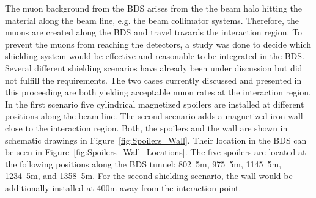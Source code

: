 \documentclass[12pt]{article}
\begin{document}
The muon background from the BDS arises from the the beam halo hitting the material along the beam line, e.g. the beam collimator systems.
Therefore, the muons are created along the BDS and travel towards the interaction region.
To prevent the muons from reaching the detectors, a study was done to decide which shielding system would be effective and reasonable to be integrated in the BDS.
Several different shielding scenarios have already been under discussion but did not fulfill the requirements.
The two cases currently discussed and presented in this proceeding are both yielding acceptable muon rates at the interaction region.
In the first scenario five cylindrical magnetized spoilers are installed at different positions along the beam line.
The second scenario adds a magnetized iron wall close to the interaction region.
Both, the spoilers and the wall are shown in schematic drawings in Figure~\ref{fig:Spoilers_Wall}.
Their location in the BDS can be seen in Figure~\ref{fig:Spoilers_Wall_Locations}.
The five spoilers are located at the following positions along the BDS tunnel: \unit{802.5}{m}, \unit{975.5}{m}, \unit{1145.5}{m}, \unit{1234.5}{m}, and \unit{1358.5}{m}.
For the second shielding scenario, the wall would be additionally installed at \unit{400}{m} away from the interaction point.\cite{Lewis}
\end{document}
